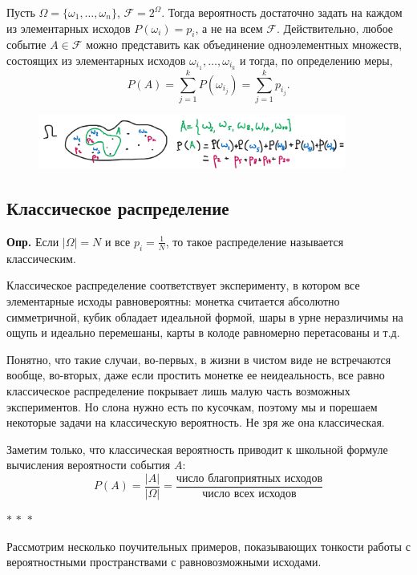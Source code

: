 \documentclass[a4paper,12pt]{article}
\newcommand{\threestars}{\begin{center}$ {\ast}\,{\ast}\,{\ast} $\end{center}}
\newcounter{th-counter}
\newcounter{df-counter}
\newcommand{\df}{\par\noindent\textbf{Опр.} }
\begin{document}
Пусть $\Omega = \{\omega_1, \ldots, \omega_n \}$, $\mathcal{F} = 2^\Omega$. Тогда вероятность достаточно задать на каждом из элементарных исходов $P(\omega_i) = p_i$, а не на всем $\mathcal{F}$. Действительно, любое событие $A \in \mathcal{F}$ можно представить как объединение одноэлементных множеств, состоящих из элементарных исходов $\omega_{i_1}, \ldots, \omega_{i_k}$ и тогда, по определению меры, 
$$P(A) = \sum_{j = 1}^kP(\omega_{i_j}) = \sum_{j=1}^k p_{i_j}.$$

\begin{figure}[h] %
    \centering
    \includegraphics[width=0.9\textwidth]{classic_probability.png} %
    \label{fig:my_image}
\end{figure}

\subsection*{Классическое распределение}

\df Если $|\Omega| = N$ и все $p_i = \frac{1}{N}$, то такое распределение называется классическим.

Классическое распределение соответствует эксперименту, в котором все элементарные исходы равновероятны: монетка считается абсолютно симметричной, кубик обладает идеальной формой, шары в урне неразличимы на ощупь и идеально перемешаны, карты в колоде равномерно перетасованы и т.д.

Понятно, что такие случаи, во-первых, в жизни в чистом виде не встречаются вообще, во-вторых, даже если простить монетке ее неидеальность, все равно классическое распределение покрывает лишь малую часть возможных экспериментов. Но слона нужно есть по кусочкам, поэтому мы и порешаем некоторые задачи на классическую вероятность. Не зря же она классическая.

Заметим только, что классическая вероятность приводит к школьной формуле вычисления вероятности события $A$:
$$\boxed{P(A) = \frac{|A|}{|\Omega|} = \frac{\text{число благоприятных исходов}}{\text{число всех исходов}}}$$

\threestars

Рассмотрим несколько поучительных примеров, показывающих тонкости работы с вероятностными пространствами с равновозможными исходами.
\end{document}
